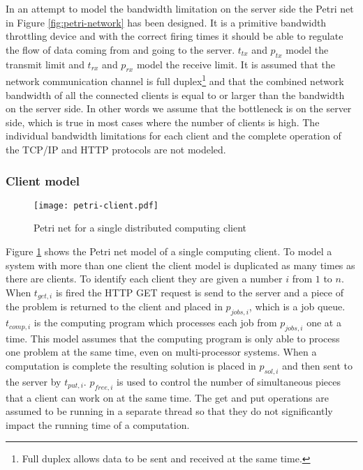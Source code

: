 In an attempt to model the bandwidth limitation on the server side the Petri net in Figure \ref{fig:petri-network} has been designed.
It is a primitive bandwidth throttling device and with the correct firing times it should be able to regulate the flow of data coming from and going to the server.
$t_{tx}$ and $p_{tx}$ model the transmit limit and $t_{rx}$ and $p_{rx}$ model the receive limit.
It is assumed that the network communication channel is full duplex\footnote{Full duplex allows data to be sent and received at the same time.} and that the combined network bandwidth of all the connected clients is equal to or larger than the bandwidth on the server side.
In other words we assume that the bottleneck is on the server side, which is true in most cases where the number of clients is high.
The individual bandwidth limitations for each client and the complete operation of the TCP/IP and HTTP protocols are not modeled.


\subsubsection{Client model}

\begin{figure}[htbp]
	\centering 
	\texttt{[image: petri-client.pdf]}
	\caption{Petri net for a single distributed computing client}
	\label{fig:petri-client}
\end{figure}

Figure \ref{fig:petri-client} shows the Petri net model of a single computing client.
To model a system with more than one client the client model is duplicated as many times as there are clients.
To identify each client they are given a number $i$ from $1$ to $n$.
When $t_{get,i}$ is fired the HTTP GET request is send to the server and a piece of the problem is returned to the client and placed in $p_{jobs,i}$, which is a job queue.
$t_{comp,i}$ is the computing program which processes each job from $p_{jobs,i}$ one at a time.
This model assumes that the computing program is only able to process one problem at the same time, even on multi-processor systems.
When a computation is complete the resulting solution is placed in $p_{sol,i}$ and then sent to the server by $t_{put,i}$.
$p_{free,i}$ is used to control the number of simultaneous pieces that a client can work on at the same time.
The get and put operations are assumed to be running in a separate thread so that they do not significantly impact the running time of a computation.


